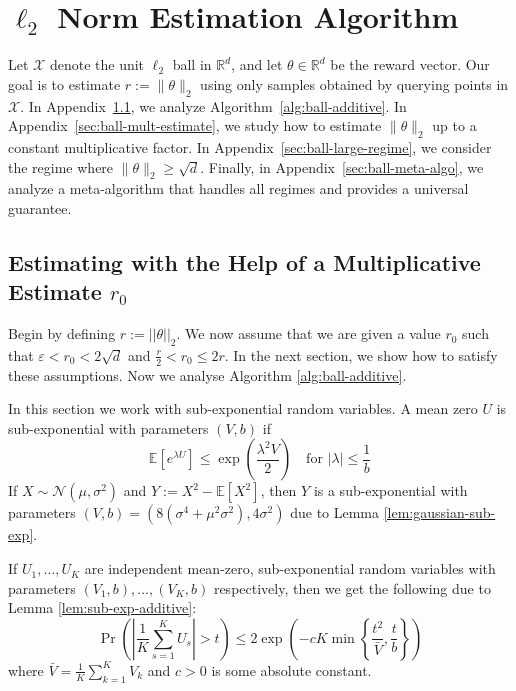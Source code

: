 \section{$\ell_2$ Norm Estimation Algorithm}\label{appendix-l2-norm-estimation}
Let $\mathcal{X}$ denote the unit $\ell_2$ ball in $\mathbb{R}^d$, and let $\theta\in\mathbb{R}^d$ be the reward vector. Our goal is to estimate $r:=\|\theta\|_2$ using only samples obtained by querying points in $\mathcal{X}$. In Appendix~\ref{sec:ball-additive-estimate}, we analyze Algorithm~\ref{alg:ball-additive}. In Appendix~\ref{sec:ball-mult-estimate}, we study how to estimate $\|\theta\|_2$ up to a constant multiplicative factor. In Appendix~\ref{sec:ball-large-regime}, we consider the regime where $\|\theta\|_2\geq \sqrt{d}$. Finally, in Appendix~\ref{sec:ball-meta-algo}, we analyze a meta-algorithm that handles all regimes and provides a universal guarantee.

\subsection{Estimating with the Help of a Multiplicative Estimate $r_0$}\label{sec:ball-additive-estimate}
Begin by defining $r:=||\theta||_2$. We now assume that we are given a value $r_0$ such that $\varepsilon<r_0<2\sqrt{d}$ and $\frac{r}{2}< r_0\leq 2r$. In the next section, we show how to satisfy these assumptions. Now we analyse Algorithm \ref{alg:ball-additive}.

In this section we work with sub-exponential random variables. A mean zero $U$ is sub-exponential with parameters $(V, b)$ if
\[
\mathbb{E}[e^{\lambda U}] \leq \exp\left( \frac{\lambda^2 V}{2} \right) \quad \text{for } |\lambda| \leq \frac{1}{b}
\]
If $X \sim \mathcal{N}(\mu, \sigma^2)$ and $Y := X^2 - \mathbb{E}[X^2]$,  
then $Y$ is a sub-exponential with parameters $(V,b)=(8\left( \sigma^4 + \mu^2 \sigma^2 \right),4\sigma^2)$ due to Lemma \ref{lem:gaussian-sub-exp}.



If $U_1, \ldots, U_K$ are independent mean-zero, sub-exponential random variables with parameters $(V_1, b),\ldots,(V_K,b)$ respectively, then we get the following due to Lemma \ref{lem:sub-exp-additive}:
\[
 \Pr\left( \left| \frac{1}{K} \sum_{s=1}^{K} U_s \right| > t \right) 
\leq 2 \exp\left( -cK \min\left\{ \frac{t^2}{\bar{V}}, \frac{t}{b} \right\} \right)
\]
where $\bar{V} = \frac{1}{K} \sum_{k=1}^{K} V_k$ and $c>0$ is some absolute constant.



